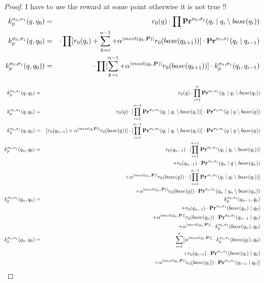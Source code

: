 \begin{proof}
	I have to use the reward at some point otherwise it is not true !!
	\begin{eqnarray*}
		k^{\sigma_0,\sigma_1}_p(q,q_0) & = & r_0(q)  
		\cdot \prod \mathbf{Pr}^{\sigma_0,\sigma_1}(q_{i} \mid q_{i} \setminus base(q_{i}))\\
		k^{\sigma_0,\sigma_1}_p(q,q_0)& =&  
		\cdot \prod [r_0(q_{i}) + \sum_{k=i}^{n-1}  + \alpha^{|meet(q_k,\mathbf{P})|} r_0(base(q_{k+1}))] \cdot \mathbf{Pr}^{\sigma_0,\sigma_1}(q_{i} \mid q_{i-1}) \\
		k^{\sigma_0,\sigma_1}_p(q,q_0) )& =&  
		\cdot \prod [\sum_{k=i}^{n-1}  + \alpha^{|meet(q_k,\mathbf{P})|} r_0(base(q_{k+1}))] \cdot k^{\sigma_0,\sigma_1}_p(q_{i}, q_{i-1})  \\
	\end{eqnarray*}
	
	\begin{eqnarray*}
		k^{\sigma_0,\sigma_1}_p(q,q_0) & = & r_0(q)  
		\cdot \prod_{i=1}^{n} \pr^{\sigma_0,\sigma_1}(q_{i} \mid q_{i} \setminus base(q_{i}))\\
		k^{\sigma_0,\sigma_1}_p(q,q_0) & = & r_0(q)  
		\cdot [\prod_{i=1}^{n-1} \pr^{\sigma_0,\sigma_1}(q_{i} \mid q_{i} \setminus base(q_{i}))] \cdot \pr^{\sigma_0,\sigma_1}(q \mid q \setminus base(q)) \\
		k^{\sigma_0,\sigma_1}_p(q,q_0) & = & [r_0(q_{n-1})+\alpha^{|meet(q,\bP)|}r_0(base(q))]  
		\cdot [\prod_{i=1}^{n-1} \pr^{\sigma_0,\sigma_1}(q_{i} \mid q_{i} \setminus base(q_{i}))] \cdot \pr^{\sigma_0,\sigma_1}(q \mid q \setminus base(q)) \\
		k^{\sigma_0,\sigma_1}_p(q_n,q_0) & = & r_0(q_{n-1})   
		\cdot [\prod_{i=1}^{n-1} \pr^{\sigma_0,\sigma_1}(q_{i} \mid q_{i} \setminus base(q_{i}))] \\
		&& + r_0(q_{n-1}) \cdot \pr^{\sigma_0,\sigma_1}(q_n \mid q \setminus base(q_n)) \\
		&&+\alpha^{|meet(q_n,\bP)|}r_0(base(q)) \cdot   
		\cdot [\prod_{i=1}^{n-1} \pr^{\sigma_0,\sigma_1}(q_{i} \mid q_{i} \setminus base(q_{i}))] \\
		&& + \alpha^{|meet(q_n,\bP)|}r_0(base(q)) \cdot \pr^{\sigma_0,\sigma_1}(q_n \mid q_n \setminus base(q_n)) \\
		k^{\sigma_0,\sigma_1}_p(q_n,q_0) & = &  k^{\sigma_0,\sigma_1}_p(q_{n-1},q_0)\\
		&& + r_0(q_{n-1}) \cdot \pr^{\sigma_0,\sigma_1}(base(q_n) \mid q_{0}) \\
		&&+\alpha^{|meet(q_n,\bP)|}r_0(base(q_n)) \cdot   
		\pr^{\sigma_0,\sigma_1}(q_{n-1} \mid q_0 ) \\
		&& + \alpha^{|meet(q_n,\bP)|} \cdot k^{\sigma_0,\sigma_1}_p(base(q_n),q_0)\\
		k^{\sigma_0,\sigma_1}_p(q_n,q_0) & = &  \sum_{i = 1}^{n}
		[\alpha^{|meet(q_i,\bP)|} \cdot k^{\sigma_0,\sigma_1}_p(base(q_i),q_0)   \\
		&&\ \ \ \ \ +r_0(q_{i-1}) \cdot \pr^{\sigma_0,\sigma_1}(base(q_i) \mid q_{0})  \\
		&&\ \  \ \ \ +\alpha^{|meet(q_i,\bP)|}r_0(base(q_i)) \cdot   
		\pr^{\sigma_0,\sigma_1}(q_{i-1} \mid q_0 ) ]
		\\
		

\end{eqnarray*}
\end{proof}
